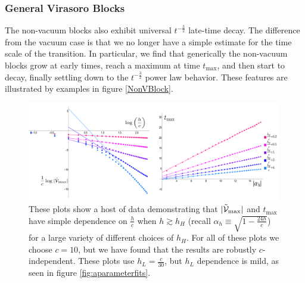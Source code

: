 \documentclass[12pt]{article}
\numberwithin{equation}{section}
\newcommand{\CV}{{\cal V}}
\begin{document}
\subsubsection{General Virasoro Blocks}

The non-vacuum blocks also exhibit universal $t^{-\frac{3}{2}}$ late-time decay. The difference from the vacuum case is that we no longer have a simple estimate for the time scale of the transition. In particular, we find that generically the non-vacuum blocks grow at early times, reach a maximum at time $t_{\max}$, and then start to  decay, finally settling down to the $t^{-\frac{3}{2}}$ power law behavior. These features are illustrated by examples in figure \ref{NonVBlock}. 

\begin{figure}[h]
\begin{centering}
\includegraphics[width=0.99\textwidth]{LotsofDataforMaxandTime}
\caption{These plots show a host of data demonstrating that $|\tilde \CV_{\max}|$ and $t_{\max}$ have simple dependence on $\frac{h}{c}$ when $h \gtrsim h_H$ (recall $\alpha_h \equiv \sqrt{1 - \frac{24h}{c}}$) for a large variety of different choices of $h_H$.  For all of these plots we choose $c=10$, but we have found that the results are robustly $c$-independent.  These plots use $h_L = \frac{c}{30}$, but $h_L$ dependence is mild, as seen in figure \ref{fig:aparameterfits}.  }
\label{fig:LotsofDataforMaxandTime}
\end{centering}
\end{figure}
\end{document}
